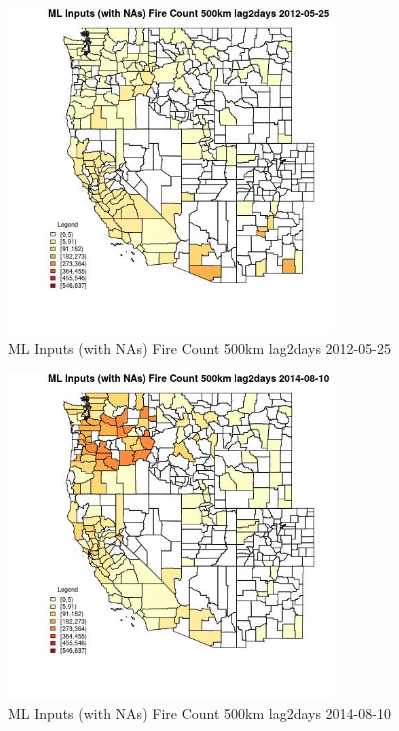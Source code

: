 \begin{figure} 
\centering  
\includegraphics[width=0.77\textwidth]{Code_Outputs/Report_ML_input_PM25_Step4_part_e_de_duplicated_aves_compiled_2019-05-18wNAs_CountyFire_Count_500km_lag2daysMean2012-05-25.jpg} 
\caption{\label{fig:Report_ML_input_PM25_Step4_part_e_de_duplicated_aves_compiled_2019-05-18wNAsCountyFire_Count_500km_lag2daysMean2012-05-25}ML Inputs (with NAs) Fire Count 500km lag2days 2012-05-25} 
\end{figure} 
 

\begin{figure} 
\centering  
\includegraphics[width=0.77\textwidth]{Code_Outputs/Report_ML_input_PM25_Step4_part_e_de_duplicated_aves_compiled_2019-05-18wNAs_CountyFire_Count_500km_lag2daysMean2014-08-10.jpg} 
\caption{\label{fig:Report_ML_input_PM25_Step4_part_e_de_duplicated_aves_compiled_2019-05-18wNAsCountyFire_Count_500km_lag2daysMean2014-08-10}ML Inputs (with NAs) Fire Count 500km lag2days 2014-08-10} 
\end{figure} 
 

